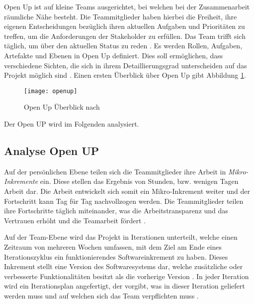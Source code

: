 Open Up ist auf kleine Teams ausgerichtet, bei welchen bei der Zusammenarbeit räumliche Nähe besteht. Die Teammitglieder haben hierbei die Freiheit, ihre eigenen Entscheidungen bezüglich ihren aktuellen Aufgaben und Prioritäten zu treffen, um die Anforderungen der Stakeholder zu erfüllen. Das Team trifft sich täglich, um über den aktuellen Status zu reden \cite{OpenUPProcess}.\newline
Es werden Rollen, Aufgaben, Artefakte und Ebenen in Open Up definiert. Dies soll ermöglichen, dass verschiedene Sichten, die sich in ihrem Detaillierungsgrad unterscheiden auf das Projekt möglich sind \cite{freudenreichevaluierung}. Einen ersten Überblick über Open Up gibt Abbildung \ref{fig:openup}.


\begin{figure}[htp]
\begin{center}
  \texttt{[image: openup]} %
  \caption{Open Up Überblick nach \cite{eclipseopenup}}
  \label{fig:openup}
\end{center}
\end{figure}

Der Open UP wird im Folgenden analysiert.

\subsection{Analyse Open UP}


Auf der persönlichen Ebene teilen sich die Teammitglieder ihre Arbeit in \textit{Mikro-Inkremente} ein. Diese stellen das Ergebnis von Stunden, bzw. wenigen Tagen Arbeit dar. Die Arbeit entwickelt sich somit ein Mikro-Inkrement weiter und der Fortschritt kann Tag für Tag nachvollzogen werden. Die Teammitglieder teilen ihre Fortschritte täglich miteinander, was die Arbeitstransparenz und das Vertrauen erhöht und die Teamarbeit fördert \cite{eclipseopenup}. \newline

Auf der Team-Ebene wird das Projekt in Iterationen unterteilt, welche einen Zeitraum von mehreren Wochen umfassen, mit dem Ziel am Ende eines Iterationszyklus ein funktionierendes Softwareinkrement zu haben. Dieses Inkrement stellt eine Version des Softwaresystems dar, welche zusätzliche oder verbesserte Funktionalitäten besitzt als die vorherige Version \cite{Basem2010}.  In jeder Iteration wird ein Iterationsplan angefertigt,  der vorgibt, was in dieser Iteration geliefert werden muss und auf welchen sich das Team verpflichten muss \cite{freudenreichevaluierung}.

